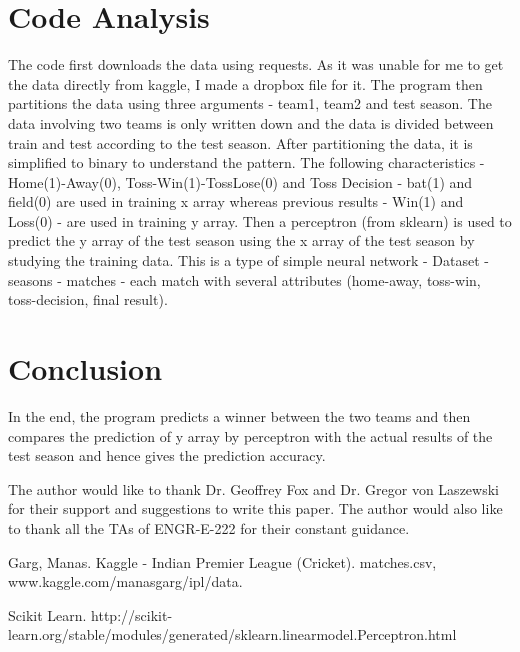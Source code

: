\section{Code Analysis}
The code first downloads the data using requests. As it was unable for me to get the data directly from kaggle, I made a dropbox file for it. The program then partitions the data using three arguments - team1, team2 and test season. The data involving two teams is only written down and the data is divided between train and test according to the test season. 
After partitioning the data, it is simplified to binary to understand the pattern. The following characteristics - Home(1)-Away(0), Toss-Win(1)-TossLose(0) and Toss Decision - bat(1) and field(0) are used in training x array whereas previous results - Win(1) and Loss(0) - are used in training y array.
Then a perceptron (from sklearn) is used to predict the y array of the test season using the x array of the test season by studying the training data.
This is a type of simple neural network - Dataset - seasons - matches - each match with several attributes (home-away, toss-win, toss-decision, final result).



\section{Conclusion}

In the end, the program predicts a winner between the two teams and then compares the prediction of y array by perceptron with the actual results of the test season and hence gives the prediction accuracy. 


\begin{acks}

  The author would like to thank Dr. Geoffrey Fox and Dr. Gregor von Laszewski for their
  support and suggestions to write this paper.
  The author would also like to thank all the TAs of ENGR-E-222 for their constant guidance.

\end{acks}


 

Garg, Manas. Kaggle - Indian Premier League (Cricket). matches.csv, www.kaggle.com/manasgarg/ipl/data.

Scikit Learn. http://scikit-learn.org/stable/modules/generated/sklearn.linearmodel.Perceptron.html

